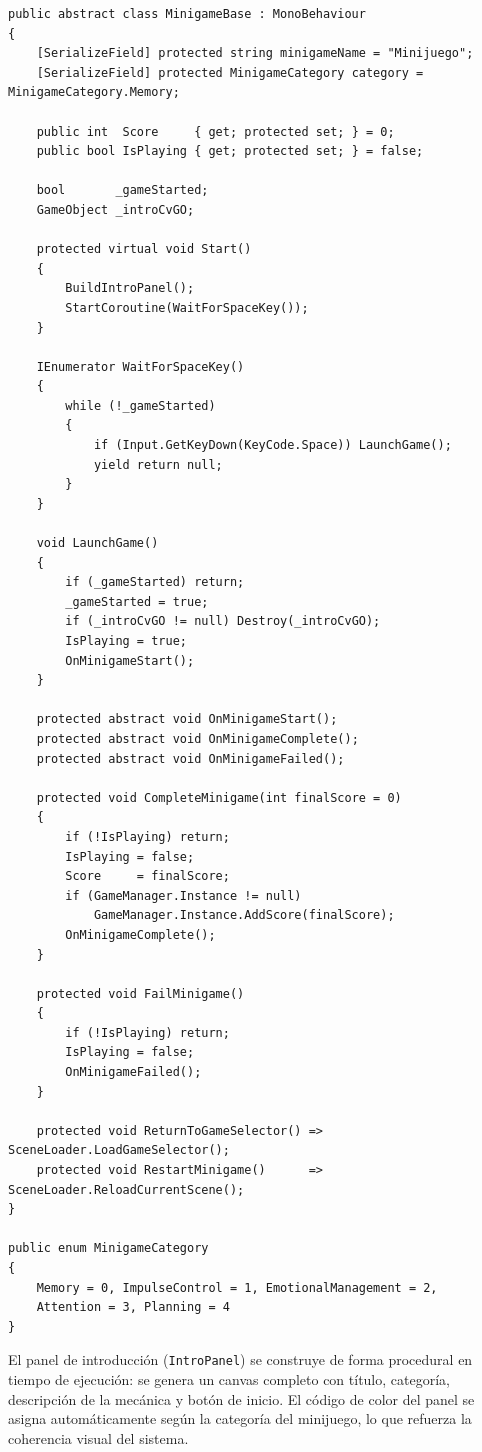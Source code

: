 \documentclass[12pt, a4paper]{report}
\begin{document}
\begin{lstlisting}[caption={MinigameBase.cs — Clase base abstracta para todos los minijuegos},
                   label={lst:minigamebase}]
public abstract class MinigameBase : MonoBehaviour
{
    [SerializeField] protected string minigameName = "Minijuego";
    [SerializeField] protected MinigameCategory category = MinigameCategory.Memory;

    public int  Score     { get; protected set; } = 0;
    public bool IsPlaying { get; protected set; } = false;

    bool       _gameStarted;
    GameObject _introCvGO;

    protected virtual void Start()
    {
        BuildIntroPanel();
        StartCoroutine(WaitForSpaceKey());
    }

    IEnumerator WaitForSpaceKey()
    {
        while (!_gameStarted)
        {
            if (Input.GetKeyDown(KeyCode.Space)) LaunchGame();
            yield return null;
        }
    }

    void LaunchGame()
    {
        if (_gameStarted) return;
        _gameStarted = true;
        if (_introCvGO != null) Destroy(_introCvGO);
        IsPlaying = true;
        OnMinigameStart();
    }

    protected abstract void OnMinigameStart();
    protected abstract void OnMinigameComplete();
    protected abstract void OnMinigameFailed();

    protected void CompleteMinigame(int finalScore = 0)
    {
        if (!IsPlaying) return;
        IsPlaying = false;
        Score     = finalScore;
        if (GameManager.Instance != null)
            GameManager.Instance.AddScore(finalScore);
        OnMinigameComplete();
    }

    protected void FailMinigame()
    {
        if (!IsPlaying) return;
        IsPlaying = false;
        OnMinigameFailed();
    }

    protected void ReturnToGameSelector() => SceneLoader.LoadGameSelector();
    protected void RestartMinigame()      => SceneLoader.ReloadCurrentScene();
}

public enum MinigameCategory
{
    Memory = 0, ImpulseControl = 1, EmotionalManagement = 2,
    Attention = 3, Planning = 4
}
\end{lstlisting}

El panel de introducción (\texttt{IntroPanel}) se construye de forma
procedural en tiempo de ejecución: se genera un canvas completo con título,
categoría, descripción de la mecánica y botón de inicio. El código de color
del panel se asigna automáticamente según la categoría del minijuego, lo
que refuerza la coherencia visual del sistema.
\end{document}
